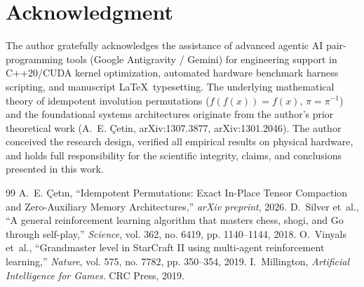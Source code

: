 \documentclass[journal,10pt,twocolumn]{article}
\begin{document}
\section*{Acknowledgment}
The author gratefully acknowledges the assistance of advanced agentic AI pair-programming tools (Google Antigravity / Gemini) for engineering support in C++20/CUDA kernel optimization, automated hardware benchmark harness scripting, and manuscript \LaTeX\ typesetting. The underlying mathematical theory of idempotent involution permutations ($f(f(x))=f(x)$, $\pi = \pi^{-1}$) and the foundational systems architectures originate from the author's prior theoretical work (A.~E. {\c{C}}etin, arXiv:1307.3877, arXiv:1301.2046). The author conceived the research design, verified all empirical results on physical hardware, and holds full responsibility for the scientific integrity, claims, and conclusions presented in this work.

\begin{thebibliography}{99}
A.~E. \c{C}et\i n, ``Idempotent Permutations: Exact In-Place Tensor Compaction and Zero-Auxiliary Memory Architectures,'' \textit{arXiv preprint}, 2026.
D.~Silver et~al., ``A general reinforcement learning algorithm that masters chess, shogi, and Go through self-play,'' \textit{Science}, vol. 362, no. 6419, pp. 1140--1144, 2018.
O.~Vinyals et~al., ``Grandmaster level in StarCraft II using multi-agent reinforcement learning,'' \textit{Nature}, vol. 575, no. 7782, pp. 350--354, 2019.
I.~Millington, \textit{Artificial Intelligence for Games}. CRC Press, 2019.
\end{thebibliography}
\end{document}
